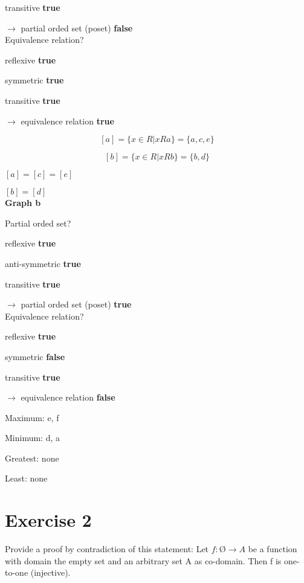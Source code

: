 \documentclass[a4paper,11pt]{article}
\begin{document}
transitive \textbf{true}

$\to$ partial orded set (poset) \textbf{false}\\

\noindent Equivalence relation?

reflexive \textbf{true}

symmetric \textbf{true}

transitive \textbf{true}

$\to$ equivalence relation \textbf{true}


$$[a]=\{x \in R | x R a\} = \{a,c,e\}$$

$$[b]=\{x \in R | x R b\} = \{b,d\}$$

$[a]=[c]=[e]$

$[b]=[d]$\\

\noindent \textbf{Graph b}

\noindent Partial orded set?

reflexive \textbf{true}

anti-symmetric \textbf{true}

transitive \textbf{true}

$\to$ partial orded set (poset) \textbf{true}\\

\noindent Equivalence relation?

reflexive \textbf{true}

symmetric \textbf{false}

transitive \textbf{true}

$\to$ equivalence relation \textbf{false}

\begin{center}
\end{center}

Maximum: e, f

Minimum: d, a

Greatest: none

Least: none

\newpage
\section*{Exercise 2}
Provide a proof by contradiction of this statement: Let $f : Ø \to A$ be a function with domain the empty set and an arbitrary set A as co-domain. Then f is one-to-one (injective).\\
\end{document}

